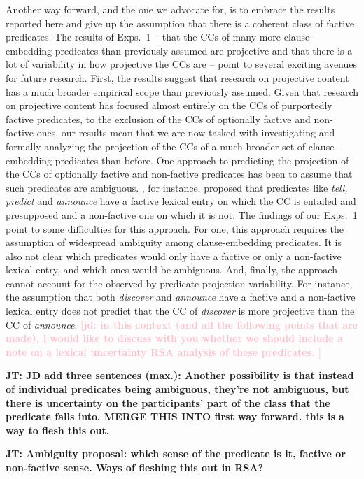 \documentclass[11pt,fleqn]{article}
\newcommand{\jd}[1]{\textbf{\textcolor{Pink}{[jd: #1]}}}
\newcommand{\6}{\mbox{$[\hspace*{-.6mm}[$}}
\newcommand{\9}{\mbox{$]\hspace*{-.6mm}]$}}
\newcommand{\jt}[1]{\textbf{\color{blue}JT: #1}}
\begin{document}
Another way forward, and the one we advocate for, is to embrace the results reported here and give up the assumption that there is a coherent class of factive predicates. The results of Exps.~1 -- that the CCs of many more clause-embedding predicates than previously assumed are projective and that there is a lot of variability in how projective the CCs are -- point to several exciting avenues for future research. First, the results suggest that research on projective content has a much broader empirical scope than previously assumed. Given that research on projective content has focused almost entirely on the CCs of purportedly factive predicates, to the exclusion of the CCs of optionally factive and non-factive ones, our results mean that we are now tasked with investigating and formally analyzing the projection of the CCs of a much broader set of clause-embedding predicates than before. One approach to predicting the projection of the CCs of optionally factive and non-factive predicates has been to assume that such predicates are ambiguous. \citet[1736]{spector-egre2015}, for instance, proposed 
that predicates like {\em tell, predict} and {\em announce}  have a factive lexical entry on which the CC is entailed and presupposed and a non-factive one on which it is not. The findings of our Exps.~1 point to some difficulties for this approach. For one, this approach requires the assumption of widespread ambiguity among clause-embedding predicates. It is also not clear which predicates would only have a factive or only a non-factive lexical entry, and which ones would be ambiguous. And, finally, the approach cannot account for the observed by-predicate projection variability. For instance, the assumption that both {\em discover} and {\em announce} have a factive and a non-factive lexical entry does not predict that the CC of {\em discover} is more projective than the CC of {\em announce}. \jd{in this context (and all the following points that are made), i would like to discuss with you whether we should include a note on a lexical uncertainty RSA analysis of these predicates. }

\jt{JD add three sentences (max.): Another possibility is that instead of individual predicates being ambiguous, they're not ambiguous, but there is uncertainty on the participants' part of the class that the predicate falls into. MERGE THIS INTO first way forward. this is a way to flesh this out.}

\jt{Ambiguity proposal: which sense of the predicate is it, factive or non-factive sense. Ways of fleshing this out in RSA?}
\end{document}
